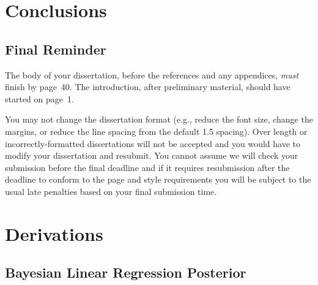 \documentclass[msc,deptreport.inf]{infthesis} %
\begin{document}
\chapter{Conclusions}

\section{Final Reminder}

The body of your dissertation, before the references and any appendices,
\emph{must} finish by page~40. The introduction, after preliminary material,
should have started on page~1.

You may not change the dissertation format (e.g., reduce the font
size, change the margins, or reduce the line spacing from the default
1.5 spacing). Over length or incorrectly-formatted dissertations will
not be accepted and you would have to modify your dissertation and
resubmit.  You cannot assume we will check your submission before the
final deadline and if it requires resubmission after the deadline to
conform to the page and style requirements you will be subject to the
usual late penalties based on your final submission time.




 \appendix
 
 \chapter{Derivations}
 
 \section{Bayesian Linear Regression Posterior}\label{app:bayesian_linear_regression_posterior}
 
\end{document}
